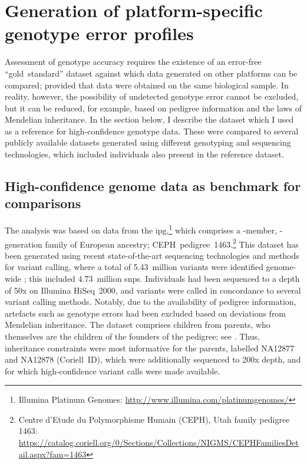 %
\section{Generation of platform-specific genotype error profiles}
\label{sec:generrprofiles}
%

Assessment of genotype accuracy requires the existence of an error-free ``gold~standard'' dataset against which data generated on other platforms can be compared; provided that data were obtained on the same biological sample.
In reality, however, the possibility of undetected genotype error cannot be excluded, but it can be reduced, for example, based on pedigree information and the laws of Mendelian inheritance.
In the section below, I describe the dataset which I used as a reference for high-confidence genotype data.
These were compared to several publicly available datasets generated using different genotyping and sequencing technologies, which included individuals also present in the reference dataset.

%
\subsection{High-confidence genome data as benchmark for comparisons}
%

The analysis was based on data from the \gls{ipg},\footnote{Illumina Platinum Genomes: \url{http://www.illumina.com/platinumgenomes/} } which comprises a -member, -generation family of European ancestry; CEPH~pedigree~1463.\footnote{Centre d'Etude du Polymorphisme Humain (CEPH), Utah family pedigree 1463: \url{https://catalog.coriell.org/0/Sections/Collections/NIGMS/CEPHFamiliesDetail.aspx?fam=1463} }
This dataset has been generated using recent state-of-the-art sequencing technologies and methods for variant calling, where a total of 5.43~million variants were identified genome-wide \citep{Eberle:2016ki}; this included 4.73~million \glspl{snp}.
Individuals had been sequenced to a depth of 50x on Illumina HiSeq~2000, and variants were called in concordance to several variant calling methods.
Notably, due to the availability of pedigree information, artefacts such as genotype errors had been excluded based on deviations from Mendelian inheritance.
The dataset comprises  children from  parents, who themselves are the children of the  founders of the pedigree; see .
Thus, inheritance constraints were most informative for the  parents, labelled \textsf{NA12877} and \textsf{NA12878} (Coriell~ID), which were additionally sequenced to 200x depth, and for which high-confidence variant calls were made available.

